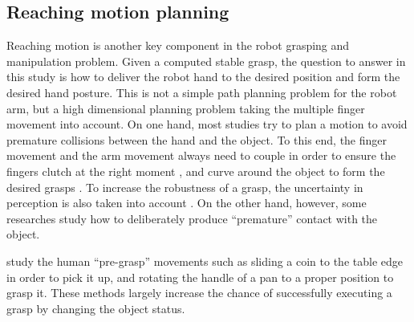 \subsection{Reaching motion planning}
\label{cha2:sec1:reaching}

Reaching motion is another key component in the robot grasping and manipulation problem. Given a computed stable grasp, the question to answer in this study is how to deliver the robot hand to the desired position and form the desired hand posture. This is not a simple path planning problem for the robot arm, but a high dimensional planning problem taking the multiple finger movement into account. On one hand, most studies try to plan a motion to avoid premature collisions between the hand and the object. To this end, the finger movement and the arm movement always need to couple in order to ensure the fingers clutch at the right moment \citep{Shukla2011CDS}, and curve around the object to form the desired grasps \citep{kroemer2011grasping}. To increase the robustness of a grasp, the uncertainty in perception is also taken into account \citep{stulp2011learning}. On the other hand, however, some researches study how to deliberately produce ``premature'' contact with the object.

\citet{chang2010planning} study the human ``pre-grasp'' movements such as sliding a coin to the table edge in order to pick it up, and rotating the handle of a pan to a proper position to grasp it. These methods largely increase the chance of successfully executing a grasp by changing the object status.
